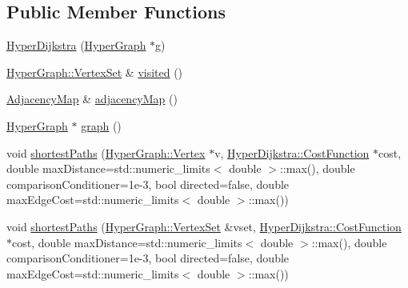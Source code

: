 \subsection*{Public Member Functions}
\begin{DoxyCompactItemize}
\item 
\hyperlink{structg2o_1_1HyperDijkstra_a55e844f4b596290cb36a0d9fe4140966}{Hyper\+Dijkstra} (\hyperlink{classg2o_1_1HyperGraph}{Hyper\+Graph} $\ast$g)
\item 
\hyperlink{classg2o_1_1HyperGraph_a703938cdb4bb636860eed55a2489d70c}{Hyper\+Graph\+::\+Vertex\+Set} \& \hyperlink{structg2o_1_1HyperDijkstra_a2cb453ed6f1bf6069186bd269a6464da}{visited} ()
\item 
\hyperlink{structg2o_1_1HyperDijkstra_af12ff8eef95094815a3fa1da0514bda2}{Adjacency\+Map} \& \hyperlink{structg2o_1_1HyperDijkstra_ace002e09514a2eeb76a7b569f9e30f6c}{adjacency\+Map} ()
\item 
\hyperlink{classg2o_1_1HyperGraph}{Hyper\+Graph} $\ast$ \hyperlink{structg2o_1_1HyperDijkstra_a578a9eb1874d9802dbd37a2f1681c196}{graph} ()
\item 
void \hyperlink{structg2o_1_1HyperDijkstra_ad88b79c73c8eaa5f1afbe27b778b542e}{shortest\+Paths} (\hyperlink{classg2o_1_1HyperGraph_1_1Vertex}{Hyper\+Graph\+::\+Vertex} $\ast$v, \hyperlink{structg2o_1_1HyperDijkstra_1_1CostFunction}{Hyper\+Dijkstra\+::\+Cost\+Function} $\ast$cost, double max\+Distance=std\+::numeric\+\_\+limits$<$ double $>$\+::max(), double comparison\+Conditioner=1e-\/3, bool directed=false, double max\+Edge\+Cost=std\+::numeric\+\_\+limits$<$ double $>$\+::max())
\item 
void \hyperlink{structg2o_1_1HyperDijkstra_a00d978615ff1bbb9917351e9cba0b4ba}{shortest\+Paths} (\hyperlink{classg2o_1_1HyperGraph_a703938cdb4bb636860eed55a2489d70c}{Hyper\+Graph\+::\+Vertex\+Set} \&vset, \hyperlink{structg2o_1_1HyperDijkstra_1_1CostFunction}{Hyper\+Dijkstra\+::\+Cost\+Function} $\ast$cost, double max\+Distance=std\+::numeric\+\_\+limits$<$ double $>$\+::max(), double comparison\+Conditioner=1e-\/3, bool directed=false, double max\+Edge\+Cost=std\+::numeric\+\_\+limits$<$ double $>$\+::max())
\end{DoxyCompactItemize}
